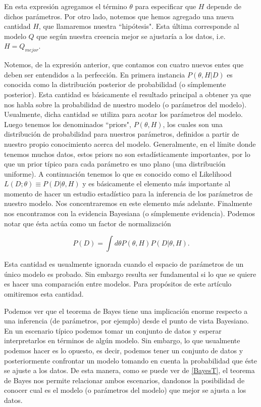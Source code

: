 \documentclass[10.5pt,prb,
               showpacs,            %
               preprintnumbers,     %
               aps,                 %
               prl,          	    %
               letterpaper,             %
               superscriptaddress,      %
               nofootinbib,         %
               tightenlines,        %
               floats,floatfix      %
               ,usenatbib]{revtex4-1}%
\begin{document}
\noindent
En esta expresi\'on agregamos el t\'ermino $\theta$ para especificar que $H$ depende de dichos par\'ametros. 
Por otro lado, notemos que hemos agregado una nueva cantidad $H$, que llamaremos nuestra ``hip\'otesis". 
Esta \'ultima corresponde al modelo $Q$ que seg\'un nuestra creencia mejor se ajustar\'ia a los datos, i.e. $H=Q_{mejor}$.

Notemos, de la expresi\'on anterior, que contamos con cuatro nuevos entes que deben ser entendidos 
a la perfecci\'on.  En primera instancia $P(\theta,H|D)$ 
es conocida como la distribuci\'on posterior de probabilidad (o s\'implemente posterior). Esta cantidad es 
b\'asicamente el resultado principal a obtener ya que nos habla sobre la probabilidad de nuestro modelo 
(o par\'ametros del modelo). 
Usualmente, dicha cantidad 
se utiliza para acotar los par\'ametros del modelo. Luego tenemos los denominados ``priors", $P(\theta,H)$, 
los cuales son una distribuci\'on de probabilidad para nuestros par\'ametros, definidos a partir de nuestro 
propio conocimiento acerca del modelo. Generalmente, en el l\'imite donde tenemos muchos datos, estos 
priors no son estad\'isticamente importantes, por lo que un prior t\'ipico para cada par\'ametro es uno plano (una distribuci\'on uniforme). A continuaci\'on tenemos lo que es conocido como el 
Likelihood $L(D;\theta)\equiv P(D|\theta,H)$ y es b\'asicamente el elemento m\'as importante al momento 
de hacer un estudio estad\'istico para la inferencia de los par\'ametros de nuestro modelo. Nos concentraremos 
en este elemento m\'as adelante. Finalmente nos encontramos con la evidencia Bayesiana (o s\'implemente evidencia). 
Podemos notar que \'esta act\'ua como un factor de normalizaci\'on

	\begin{equation}\label{BayesT2}
		P(D) = \int d\theta P(\theta,H)P(D|\theta,H).
	\end{equation}

\noindent
Esta cantidad es usualmente ignorada cuando el espacio de par\'ametros de un \'unico 
modelo es probado. Sin embargo resulta ser fundamental si lo que se quiere es hacer una 
comparaci\'on entre modelos. Para prop\'ositos de este art\'iculo omitiremos esta cantidad.

Podemos ver que el teorema de Bayes tiene una implicaci\'on enorme respecto a una inferencia 
(de par\'ametros, por ejemplo) desde el punto de vista Bayesiano. En un escenario t\'ipico podemos 
tomar un conjunto de datos y esperar interpretarlos en t\'erminos de alg\'un modelo. Sin embargo, 
lo que usualmente podemos hacer es lo opuesto, es decir, podemos tener un conjunto de datos y 
posteriormente confrontar un modelo tomando en cuenta la probabilidad que \'este se ajuste a los datos. 
De esta manera, como se puede ver de \eqref{BayesT}, el teorema de Bayes nos permite relacionar ambos 
escenarios, dandonos la posibilidad de conocer cual es el modelo (o par\'ametros del modelo) que mejor se ajusta a los datos.
\end{document}
